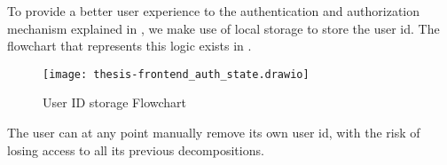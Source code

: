 To provide a better user experience to the authentication and authorization mechanism explained in , we make use of local storage to store the user id. The flowchart that represents this logic exists in .

\begin{figure*}[!htb]
  \caption{User ID storage Flowchart}
  \label{fig:frontend_auth_state}
  \centering
  \texttt{[image: thesis-frontend\_auth\_state.drawio]}
\end{figure*}

The user can at any point manually remove its own user id, with the risk of losing access to all its previous decompositions.

